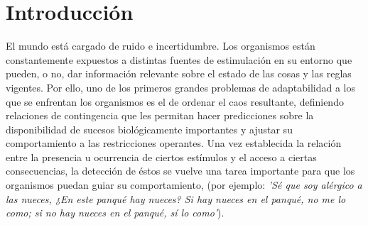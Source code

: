 
\chapter{Introducción} %

\label{Chapter1} %


\newcommand{\keyword}[1]{\textbf{#1}}
\newcommand{\tabhead}[1]{\textbf{#1}}
\newcommand{\code}[1]{\texttt{#1}}
\newcommand{\file}[1]{\texttt{\bfseries#1}}
\newcommand{\option}[1]{\texttt{\itshape#1}}


El mundo está cargado de ruido e incertidumbre. Los organismos están constantemente expuestos a distintas fuentes de estimulación en su entorno que pueden, o no, dar información relevante sobre el estado de las cosas y las reglas vigentes. Por ello, uno de los primeros grandes problemas de adaptabilidad a los que se enfrentan los organismos es el de ordenar el caos resultante, definiendo relaciones de contingencia que les permitan hacer predicciones sobre la disponibilidad de sucesos biológicamente importantes y ajustar su comportamiento a las restricciones operantes. Una vez establecida la relación entre la presencia u ocurrencia de ciertos estímulos y el acceso a ciertas consecuencias, la detección de éstos se vuelve una tarea importante para que los organismos puedan guiar su comportamiento, (por ejemplo: \textit{'Sé que soy alérgico a las nueces, ¿En este panqué hay nueces? Si hay nueces en el panqué, no me lo como; si no hay nueces en el panqué, sí lo como'}).\\



